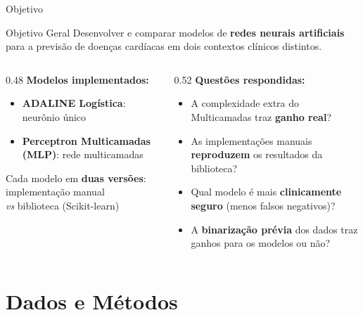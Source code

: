 \documentclass[aspectratio=169,11pt,brazil]{beamer}
\begin{document}
\begin{frame}{Objetivo}
  \begin{block}{Objetivo Geral}
    Desenvolver e comparar modelos de \textbf{redes neurais artificiais} para a previsão de doenças cardíacas em dois contextos clínicos distintos.
  \end{block}
  \vspace{0.4em}
  \begin{columns}[T]
    \begin{column}{0.48\textwidth}
      \textbf{Modelos implementados:}
      \begin{itemize}
        \item \textbf{ADALINE Logística}: neurônio único
        \item \textbf{Perceptron Multicamadas (MLP)}: rede multicamadas
      \end{itemize}
      \smallskip
      Cada modelo em \textbf{duas versões}:\\
      \quad implementação manual\\
      \quad \textit{vs} biblioteca (Scikit-learn)
    \end{column}
    \begin{column}{0.52\textwidth}
      \textbf{Questões respondidas:}
      \begin{itemize}
        \item A complexidade extra do Multicamadas traz \textbf{ganho real}?
        \item As implementações manuais \textbf{reproduzem} os resultados da biblioteca?
        \item Qual modelo é mais \textbf{clinicamente seguro} (menos falsos negativos)?
        \item A \textbf{binarização prévia} dos dados traz ganhos para os modelos ou não?
      \end{itemize}
    \end{column}
  \end{columns}
\end{frame}

\section{Dados e Métodos}
\end{document}
